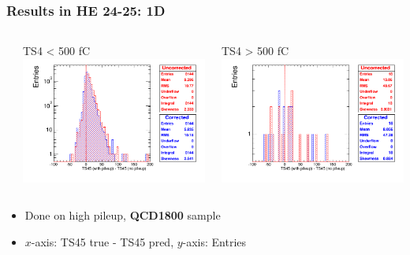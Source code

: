 \documentclass[bigger]{beamer}
\providecommand{\alert}[1]{\textbf{#1}}
\begin{document}
\begin{frame}
\frametitle{Results in HE 24-25: 1D}
\label{sec-3-3-16}
\begin{columns} %
\label{sec-3-3-16-1}
\begin{column}{0.55\textwidth}
\label{sec-3-3-16-1-1}

\centering
TS4 < 500 fC
\includegraphics[width=\textwidth]{fig/correction_comparison_1D_sample1800_under500_ring3.png}
\end{column}
\begin{column}{0.55\textwidth}
\label{sec-3-3-16-1-2}

\centering
TS4 > 500 fC
\includegraphics[width=\textwidth]{fig/correction_comparison_1D_sample1800_over500_ring3.png}
\end{column}
\end{columns}
\label{sec-3-3-16-2}
\begin{itemize}

\item Done on high pileup, \alert{QCD1800} sample
\label{sec-3-3-16-2-1}%

\item $x$-axis: TS45 true - TS45 pred, $y$-axis: Entries
\label{sec-3-3-16-2-2}%
\end{itemize} %
\end{frame}
\end{document}

